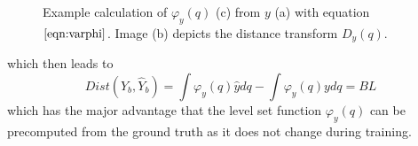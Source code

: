 \begin{figure}[H]
    \caption[Calculation of $\varphi_y(q)$]{Example calculation of $\varphi_y(q)$ (c) from $y$ (a) with equation $\ref{eqn:varphi}$. Image (b) depicts the distance transform $D_y(q)$.}
    \label{varphi_q}
\end{figure}
which then leads to
\begin{equation}
    Dist(Y_b,\hat{Y}_b)=\int \varphi_y(q)\hat{y} dq -\int \varphi_y(q)y dq=BL
\end{equation}
which has the major advantage that the level set function $\varphi_y(q)$ can be precomputed from the ground truth as it does not change during training.
